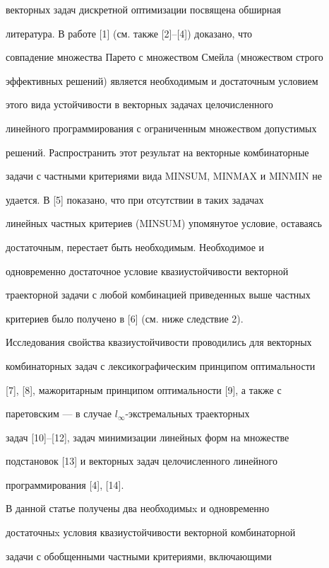 векторных задач дискретной оптимизации посвящена обширная


литература. В работе [1] (см. также [2]--[4]) доказано, что


совпадение множества Парето с множеством Смейла (множеством строго


эффективных решений) является необходимым и достаточным условием


этого вида устойчивости в векторных задачах целочисленного


линейного программирования с ограниченным множеством допустимых


решений. Распространить этот результат на векторные комбинаторные


задачи с частными критериями вида MINSUM, MINMAX и MINMIN не


удается. В [5] показано, что при отсутствии в таких задачах


линейных частных критериев (MINSUM) упомянутое условие, оставаясь


достаточным, перестает быть необходимым. Необходимое и


одновременно достаточное условие квазиустойчивости векторной


траекторной задачи с любой комбинацией приведенных выше частных


критериев было получено в [6] (см. ниже следствие 2).





Исследования свойства квазиустойчивости проводились для векторных


комбинаторных задач с лексикографическим принципом оптимальности


[7], [8], мажоритарным принципом оптимальности [9], а также с


паретовским --- в случае $l_\infty$-экстремальных траекторных


задач [10]--[12], задач минимизации линейных форм на множестве


подстановок [13] и векторных задач целочисленного линейного


программирования [4], [14].





В данной статье получены два необходимыx и одновременно


достаточныx условия квазиустойчивости векторной комбинаторной


задачи с обобщенными частными критериями, включающими


